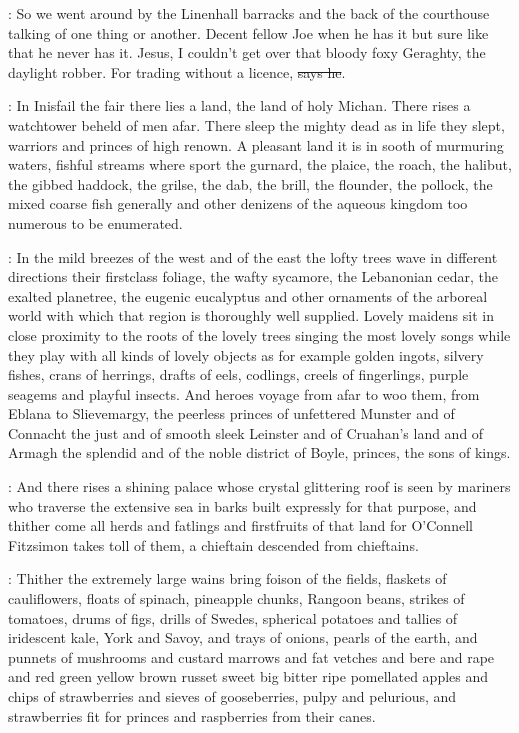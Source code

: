 \Nq:
So we went around by the Linenhall barracks and the back of the
courthouse talking of one thing or another. Decent fellow Joe when he has
it but sure like that he never has it. Jesus, I couldn't get over that
bloody foxy Geraghty, the daylight robber. For trading without a licence,
\sout{says he}.

:
In Inisfail the fair there lies a land, the land of holy Michan. There
rises a watchtower beheld of men afar. There sleep the mighty dead as in
life they slept, warriors and princes of high renown.
A pleasant land it
is in sooth of murmuring waters, fishful streams where sport the gurnard,
the plaice, the roach, the halibut, the gibbed haddock, the grilse,
the dab, the brill, the flounder, the pollock, the mixed coarse fish
generally and other denizens of the aqueous kingdom too numerous to be
enumerated.

:
In the mild breezes of the west and of the east the lofty
trees wave in different directions their firstclass foliage, the wafty
sycamore, the Lebanonian cedar, the exalted planetree, the eugenic
eucalyptus and other ornaments of the arboreal world with which that
region is thoroughly well supplied. Lovely maidens sit in close proximity
to the roots of the lovely trees singing the most lovely songs
while they
play with all kinds of lovely objects as for example golden ingots,
silvery fishes, crans of herrings, drafts of eels, codlings, creels of
fingerlings, purple seagems and playful insects.  And heroes voyage from
afar to woo them, from Eblana to Slievemargy, the peerless princes of
unfettered Munster and of Connacht the just and of smooth sleek Leinster
and of Cruahan's land and of Armagh the splendid and of the noble district
of Boyle, princes, the sons of kings.

:
And there rises a shining palace whose crystal glittering roof is seen by
mariners who traverse the extensive sea in barks built expressly for that
purpose, and thither come all herds and fatlings and firstfruits of that
land for O'Connell Fitzsimon takes toll of them,
a chieftain descended
from chieftains.

:
Thither the extremely large wains bring foison of the
fields, flaskets of cauliflowers, floats of spinach, pineapple chunks,
Rangoon beans, strikes of tomatoes, drums of figs, drills of Swedes,
spherical potatoes and tallies of iridescent kale, York and Savoy, and
trays of onions, pearls of the earth, and punnets of mushrooms and
custard marrows and fat vetches and bere and rape and red green yellow
brown russet sweet big bitter ripe pomellated apples and chips of
strawberries and sieves of gooseberries, pulpy and pelurious, and
strawberries fit for princes and raspberries from their canes.

